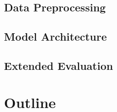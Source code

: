
\subsection{Data Preprocessing}
\label{ch:intro-contributions-dataPreprocessing}


\subsection{Model Architecture} %
\label{ch:intro-contributions-modelArchitecture}


\subsection{Extended Evaluation}
\label{ch:intro-contributions-extendedEvaluation}



\section{Outline}
\label{ch:intro-outline}
